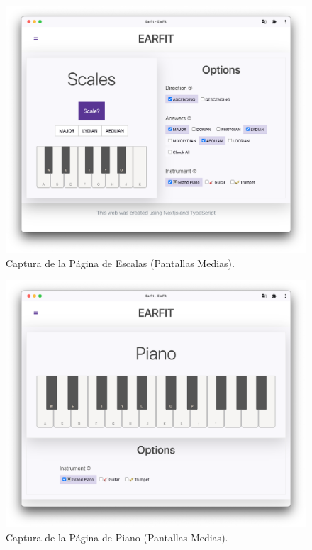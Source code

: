 \documentclass[12pt,twoside,titlepage]{report}
\begin{document}
{\begin{figure}[H]
    \centering
    \includegraphics[scale=0.3]{Capturas Earfit/Tablet/Scales}
    \caption{Captura de la Página de Escalas (Pantallas Medias).}
    \label{fig:TabletScales}
\end{figure}

\begin{figure}[H]
    \centering
    \includegraphics[scale=0.3]{Capturas Earfit/Tablet/Piano}
    \caption{Captura de la Página de Piano (Pantallas Medias).}
    \label{fig:TabletPiano}
\end{figure}

}
\end{document}
